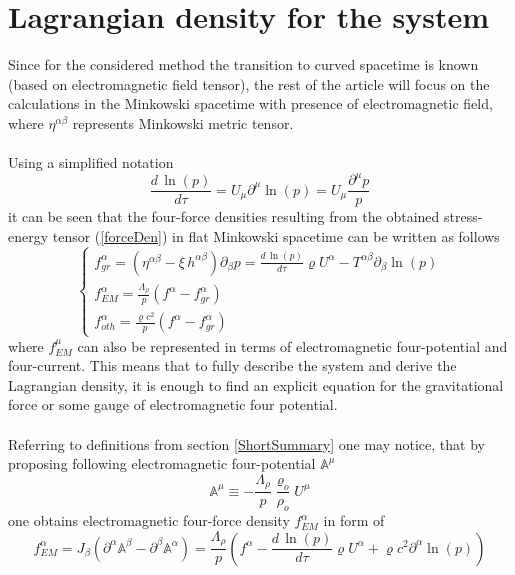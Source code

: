 \documentclass[aps,prx,preprint,groupedaddress,showkeys]{revtex4-2}
\newcommand{\mds}[1] {\frac{d {#1}}{d\tau}}
\begin{document}
\section{Lagrangian density for the system} \label{SepOfFields}

Since for the considered method the transition to curved spacetime is known (based on electromagnetic field tensor), the rest of the article will focus on the calculations in the Minkowski spacetime with presence of electromagnetic field, where $\eta^{\alpha \beta}$ represents Minkowski metric tensor. \\
~\\
Using a simplified notation
\begin{equation} \label{simplfNot}
\mds{\, \ln{(p)}} = U_{\mu} \partial^{\mu} \ln{(p)} = U_{\mu} \frac{\partial^{\mu} p}{p}
\end{equation}
it can be seen that the four-force densities resulting from the obtained stress-energy tensor (\ref{forceDen}) in flat Minkowski spacetime can be written as follows
\begin{equation} \label{forceDenNew}
\begin{cases} 
f^{\alpha}_{gr} = \left ( \eta^{\alpha \beta} - \xi \, h^{\alpha \beta}  \right ) \partial_{\beta} p = \mds{\,\ln{(p)}} \varrho U^{\alpha} - T^{\alpha \beta}  \partial_{\beta} \ln{(p)}  \\
f^{\alpha}_{EM} = \frac{\Lambda_{\rho}}{p} \left ( f^{\alpha} - f^{\alpha}_{gr} \right )\\
f^{\alpha}_{oth} = \frac{\varrho c^2}{p} \left ( f^{\alpha} - f^{\alpha}_{gr} \right )
\end{cases}
\end{equation}
where $f^{\mu}_{EM}$ can also be represented in terms of electromagnetic four-potential and four-current. This means that to fully describe the system and derive the Lagrangian density, it is enough to find an explicit equation for the gravitational force or some gauge of electromagnetic four potential.\\
~\\
Referring to definitions from section \ref{ShortSummary} one may notice, that by proposing following electromagnetic four-potential $\mathbb{A}^{\mu}$
\begin{equation} \label{EM4pot}
\mathbb{A}^{\mu} \equiv - \frac{\Lambda_{\rho}}{p} \frac{\varrho_o}{\rho_o} U^{\mu}
\end{equation}
one obtains electromagnetic four-force density $f^{\alpha}_{EM}$ in form of
\begin{equation} \label{EM4EMf}
f^{\alpha}_{EM} = J_{\beta} \left ( \partial^{\alpha}\mathbb{A}^{\beta} - \partial^{\beta}\mathbb{A}^{\alpha} \right ) = \frac{\Lambda_{\rho}}{p} \left ( f^{\alpha} - \mds{\,\ln{(p)}} \varrho U^{\alpha} + \varrho c^2 \partial^{\alpha} \ln{(p)}  \right )
\end{equation}
\end{document}
